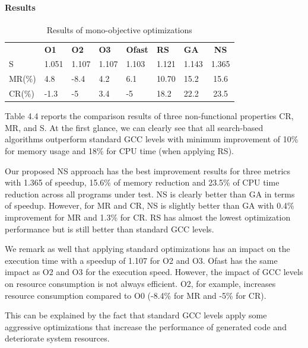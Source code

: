 \paragraph{Results}

\begin{table}[h]
	\centering
	\caption{Results of mono-objective optimizations}
	\label{my-label}
	\begin{tabular}{|l|l|l|l|l|l|l|c|}
		\hline
		& \textbf{O1}                    & \textbf{O2}                    & \textbf{O3}                    & \textbf{Ofast}                 & \textbf{RS}                    & \textbf{GA}                    & 
		\textbf{NS} \\
		\hhline{|=|=|=|=|=|=|=|=|}
		S  &  1.051 & 1.107  & 1.107  & 1.103  & 1.121  &  1.143 &  1.365  \\ \hline
		MR(\%) & 4.8  & -8.4  &  4.2 & 6.1  &  10.70 & 15.2  &  15.6  \\ \hline
		CR(\%) & -1.3  & -5  & 3.4  & -5  &  18.2 & 22.2  &  23.5  \\ \hline
	\end{tabular}
\end{table}

Table 4.4 reports the comparison results of three non-functional properties CR, MR, and S. At the first glance, we can clearly see that all search-based algorithms outperform standard GCC levels with minimum improvement of 10\% for memory usage and 18\% for CPU time (when applying RS).
 
Our proposed NS approach has the best improvement results for three metrics with 1.365 of speedup, 15.6\% of memory reduction and 23.5\% of CPU time reduction across all programs under test. NS is clearly better than GA in terms of speedup. However, for MR and CR, NS is slightly better than GA with 0.4\% improvement for MR and 1.3\% for CR. RS has almost the lowest optimization performance but is still better than standard GCC levels.

We remark as well that applying standard optimizations has an impact on the execution time with a speedup of 1.107 for O2 and O3. Ofast has the same impact as O2 and O3 for the execution speed. However, the impact of GCC levels on resource consumption is not always efficient. O2, for example, increases resource consumption compared to O0 (-8.4\% for MR and -5\% for CR). 

This can be explained by the fact that standard GCC levels apply some aggressive optimizations that increase the performance of generated code and deteriorate system resources.  


